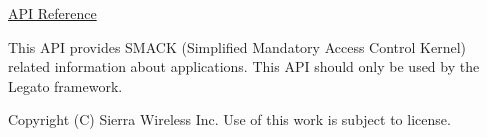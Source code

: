 \hyperlink{app_smack__interface_8h}{A\+P\+I Reference}

This A\+P\+I provides S\+M\+A\+C\+K (Simplified Mandatory Access Control Kernel) related information about applications. This A\+P\+I should only be used by the Legato framework.





Copyright (C) Sierra Wireless Inc. Use of this work is subject to license. 